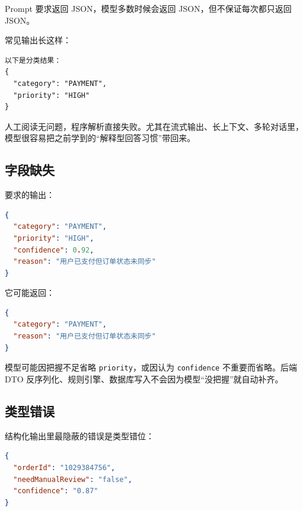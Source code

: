 \documentclass[9pt,a4paper,twocolumn]{ctexart}
\begin{document}
Prompt 要求返回 JSON，模型多数时候会返回 JSON，但不保证每次都只返回 JSON。



常见输出长这样：



\begin{lstlisting}
以下是分类结果：
{
  "category": "PAYMENT",
  "priority": "HIGH"
}
\end{lstlisting}



人工阅读无问题，程序解析直接失败。尤其在流式输出、长上下文、多轮对话里，模型很容易把之前学到的“解释型回答习惯”带回来。



\subsection*{字段缺失}


要求的输出：



\begin{lstlisting}[language=json]
{
  "category": "PAYMENT",
  "priority": "HIGH",
  "confidence": 0.92,
  "reason": "用户已支付但订单状态未同步"
}
\end{lstlisting}



它可能返回：



\begin{lstlisting}[language=json]
{
  "category": "PAYMENT",
  "reason": "用户已支付但订单状态未同步"
}
\end{lstlisting}



模型可能因把握不足省略 \texttt{priority}，或因认为 \texttt{confidence} 不重要而省略。后端 DTO 反序列化、规则引擎、数据库写入不会因为模型“没把握”就自动补齐。



\subsection*{类型错误}


结构化输出里最隐蔽的错误是类型错位：



\begin{lstlisting}[language=json]
{
  "orderId": "1029384756",
  "needManualReview": "false",
  "confidence": "0.87"
}
\end{lstlisting}
\end{document}

